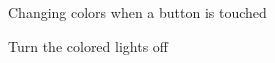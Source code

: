 \begin{figure}[htb]
\begin{center}
\caption{Changing colors when a button is touched}\label{fig.colors}
\end{center}
\end{figure}

\begin{figure}[htb]
\begin{center}
\caption{Turn the colored lights off}\label{fig.colors-off}
\end{center}
\end{figure}
